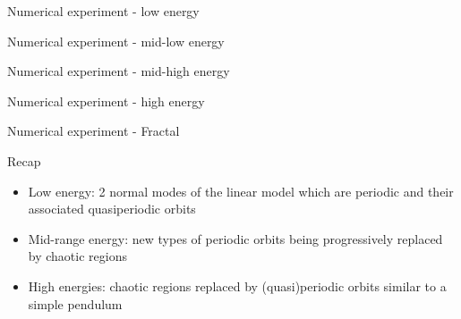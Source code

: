 \documentclass{beamer}
\begin{document}
\begin{frame}{Numerical experiment - low energy}
\begin{figure}
    \centering
    
\end{figure}
\end{frame}

\begin{frame}{Numerical experiment - mid-low energy}
\begin{figure}
    \centering
    
\end{figure}
\end{frame}

\begin{frame}{Numerical experiment - mid-high energy}
\begin{figure}
    \centering
    
\end{figure}
\end{frame}

\begin{frame}{Numerical experiment - high energy}
\begin{figure}
    \centering
    
\end{figure}
\end{frame}

\begin{frame}{Numerical experiment - Fractal}
    \centering
    
\end{frame}

\begin{frame}{Recap}
\begin{itemize}
    \setlength\itemsep{\fill}
    \item Low energy: 2 normal modes of the linear model which are periodic and their associated quasiperiodic orbits
    \item Mid-range energy: new types of periodic orbits being progressively replaced by chaotic regions
    \item High energies: chaotic regions replaced by (quasi)periodic orbits similar to a simple pendulum
\end{itemize} 
\end{frame}
\end{document}
